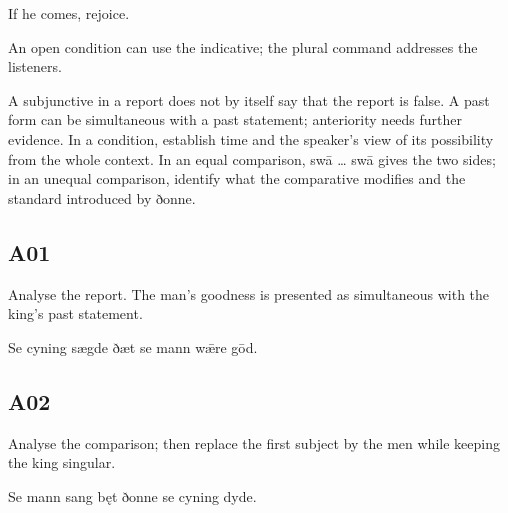 If he comes, rejoice.

An open condition can use the indicative; the plural command addresses the listeners.

A subjunctive in a report does not by itself say that the report is false. A past form can be simultaneous with a past statement; anteriority needs further evidence. In a condition, establish time and the speaker’s view of its possibility from the whole context. In an equal comparison, swā … swā gives the two sides; in an unequal comparison, identify what the comparative modifies and the standard introduced by ðonne.

\subsection*{A01}

Analyse the report. The man’s goodness is presented as simultaneous with the king’s past statement.

Se cyning sægde ðæt se mann wǣre gōd.




\subsection*{A02}

Analyse the comparison; then replace the first subject by the men while keeping the king singular.

Se mann sang bęt ðonne se cyning dyde.

